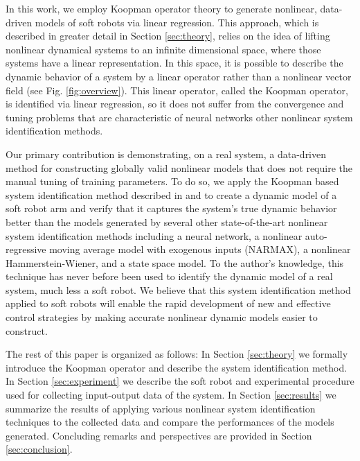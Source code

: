 In this work, we employ Koopman operator theory to generate nonlinear, data-driven models of soft robots via linear regression.
This approach, which is described in greater detail in Section \ref{sec:theory}, relies on the idea of lifting nonlinear dynamical systems to an infinite dimensional space, where those systems have a linear representation.
In this space, it is possible to describe the dynamic behavior of a system by a linear operator rather than a nonlinear vector field (see Fig. \ref{fig:overview}).
This linear operator, called the Koopman operator, is identified via linear regression, so it does not suffer from the convergence and tuning problems that are characteristic of neural networks other nonlinear system identification methods.


Our primary contribution is demonstrating, on a real system, a data-driven method for constructing globally valid nonlinear models that does not require the manual tuning of training parameters.
To do so, we apply the Koopman based system identification method described in \cite{mauroy2016linear} and \cite{mauroy2017koopman} to create a dynamic model of a soft robot arm and verify that it captures the system's true dynamic behavior better than the models generated by several other state-of-the-art nonlinear system identification methods including a neural network, a nonlinear auto-regressive moving average model with exogenous inputs (NARMAX), a nonlinear Hammerstein-Wiener, and a state space model.
To the author's knowledge, this technique has never before been used to identify the dynamic model of a real system, much less a soft robot.
We believe that this system identification method applied to soft robots will enable the rapid development of new and effective control strategies by making accurate nonlinear dynamic models easier to construct.


The rest of this paper is organized as follows:
In Section \ref{sec:theory} we formally introduce the Koopman operator and describe the system identification method. 
In Section \ref{sec:experiment} we describe the soft robot and experimental procedure used for collecting input-output data of the system.
In Section \ref{sec:results} we summarize the results of applying various nonlinear system identification techniques to the collected data and compare the performances of the models generated. 
Concluding remarks and perspectives are provided in Section \ref{sec:conclusion}.